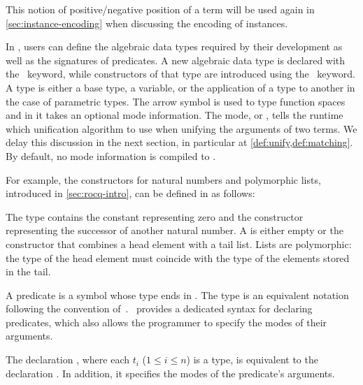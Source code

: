 This notion of positive/negative position of a term will be used again in
\cref{sec:instance-encoding} when discussing the encoding of instances.


In \elpi, users can define the algebraic data types required by their
development as well as the signatures of predicates. A new algebraic data type
is declared with the \kind\ keyword, while constructors of that type are
introduced using the \type\ keyword. A type is either a
base type, a variable, or the application of a type to another in the
case of parametric types. The arrow symbol is used to type function spaces and in
\elpi it takes an optional mode information. The mode, \Einput or
\Eoutput, tells the runtime which unification algorithm to use when unifying the
arguments of two terms. We delay this discussion in the next section,
in particular at \cref{def:unify,def:matching}. By
default, no mode information is compiled to \Eoutput.

For example, the constructors for natural numbers and polymorphic lists,
introduced in \cref{sec:rocq-intro}, can be defined in \elpi as follows:

\mvspace
\begin{minipage}{0.45\textwidth}
  
\end{minipage}
\begin{minipage}{0.5\textwidth}
  
\end{minipage}
\mvspace

The type  contains the constant  representing zero and the
constructor  representing the successor of another natural number.
A  is either empty  or the
constructor  that combines a head element with a tail list.
Lists are polymorphic: the type of the head element must coincide with
the type of the elements stored in the tail.

A predicate is a symbol whose type ends in . The type 
is an equivalent notation following the convention of~\cite{miller2012}.
\elpi\ provides a dedicated syntax for declaring predicates, which also
allows the programmer to specify the modes of their arguments.


The declaration , where
each $t_i$ ($1 \leq i \leq n$) is a type, is equivalent to the declaration
. In addition, it specifies the
modes of the predicate's arguments.


